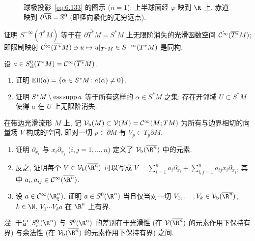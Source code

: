 \begin{figure}[htbp]
\centering
\drawFigSixNine
\caption{球极投影~\eqref{eq:6.133} 的图示 ($n = 1$): 上半球面经 $\varphi$ 映到 $\R$ 上, 赤道映到 $\partial\overline{\R} = \mathbb{S}^{0}$ (即径向紧化的无穷远点).}
\label{fig:6.9}
\end{figure}

\begin{exer}[残余符号与径向紧化]\label{ex:6.17}
证明 $S^{-\infty}(T^* M)$ 等于在 $\partial\overline{T^*}M = S^* M$ 上无限阶消失的光滑函数空间 $\dot{\mathcal{C}^\infty}(\overline{T^*}M)$; 即限制映射 $\dot{\mathcal{C}^\infty}(\overline{T^*}M) \ni u \mapsto u|_{T^* M} \in S^{-\infty}(T^* M)$ 是同构.
\end{exer}

\begin{exer}[关于经典符号的更多内容]\label{ex:6.18}
设 $a \in S^0_{\mathrm{cl}}(T^* M) = \mathcal{C}^\infty(\overline{T^*}M)$.
\begin{enumerate}
    \item 证明 $\operatorname{Ell}(a) = \{\alpha \in S^* M \colon a(\alpha) \neq 0\}$.
    \item 证明 $S^* M \setminus \operatorname{ess\,supp} a$ 等于所有这样的 $\alpha \in S^* M$ 之集: 存在开邻域 $U \subset S^* M$ 使得 $a$ 在 $U$ 上无限阶消失.
\end{enumerate}
\end{exer}

\begin{exer}[符号在径向紧化上的正则性]\label{ex:6.19}
在带边光滑流形 $M$ 上, 记 $\mathcal{V}_{\mathrm{b}}(M) \subset \mathcal{V}(M) = \mathcal{C}^\infty(M; TM)$ 为所有与边界相切的向量场 $V$ 构成的空间, 即对一切 $p \in \partial M$ 有 $V_p \in T_p\partial M$.
\begin{enumerate}
    \item 证明 $\partial_{x_i}$ 与 $x_i\partial_{x_j}$ ($i, j = 1, \ldots, n$) 定义了 $\mathcal{V}_{\mathrm{b}}(\overline{\R^n})$ 中的元素.
    \item 反之, 证明每个 $V \in \mathcal{V}_{\mathrm{b}}(\overline{\R^n})$ 可以写成 $V = \sum_{i=1}^n a_i \partial_{x_i} + \sum_{i,j=1}^n a_{ij}x_i\partial_{x_j}$, 其中 $a_i, a_{ij} \in \Smooth(\overline{\R^n})$.
    \item 设 $a \in \Smooth(\R^n_\xi)$. 证明 $a \in S^0(\R^n)$ 当且仅当对一切 $V_1, \ldots, V_k \in \mathcal{V}_{\mathrm{b}}(\overline{\R^n})$, $k \in \N$, $V_1 \cdots V_k a$ 在 $\R^n$ 上有界.
\end{enumerate}
\emph{注.} 于是 $S^0_{\mathrm{cl}}(\R^n)$ 与 $S^0(\R^n)$ 的差别在于光滑性 (在 $\mathcal{V}(\overline{\R^n})$ 的元素作用下保持有界) 与余法性 (在 $\mathcal{V}_{\mathrm{b}}(\overline{\R^n})$ 的元素作用下保持有界) 之间.
\end{exer}

